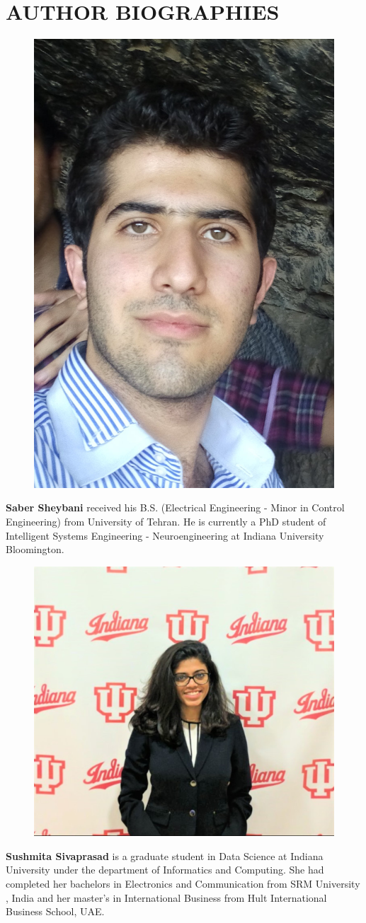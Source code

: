 \documentclass[9pt,twocolumn,twoside]{../../styles/osajnl}
\begin{document}
\section*{AUTHOR BIOGRAPHIES}
\begingroup
\setlength\intextsep{0pt}
\begin{minipage}[t][3.2cm][t]{1.0\columnwidth} %
  \begin{figure}
    \includegraphics[width=0.25\columnwidth]{images/saber.jpg}
  \end{figure}
  \noindent
  {\bfseries Saber Sheybani} received his B.S. (Electrical Engineering - 
  Minor in Control Engineering) from University of Tehran.  He is currently 
  a PhD student of Intelligent Systems Engineering - Neuroengineering at 
  Indiana University Bloomington.
\end{minipage}
\begin{minipage}[t][3.2cm][t]{1.0\columnwidth} %
  \begin{figure}
    \includegraphics[width=0.25\columnwidth]{images/sushmita.png}
  \end{figure}
  \noindent
  {\bfseries Sushmita Sivaprasad} is a graduate student in Data Science at
Indiana University under the department of Informatics and
Computing. She had completed her bachelors in Electronics and
Communication from SRM University , India and her master's in
International Business from Hult International Business School, UAE.

\end{minipage}
\endgroup


\end{document}
